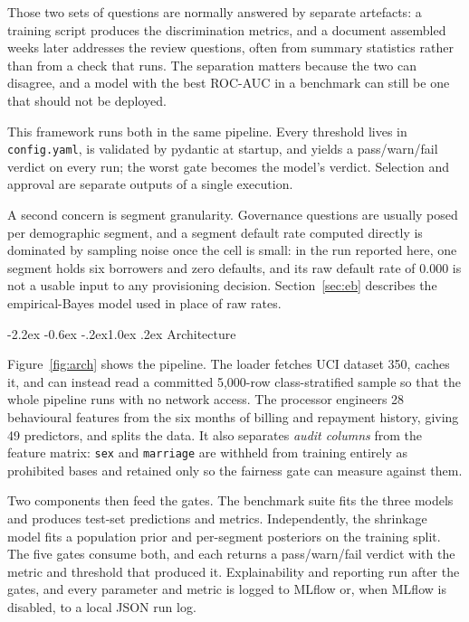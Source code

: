 \documentclass[10pt,a4paper]{article}
\makeatletter
\renewcommand\section{\@startsection{section}{1}{\z@}%
  {-2.2ex \@plus -0.6ex \@minus -.2ex}{1.0ex \@plus .2ex}%
  {\normalfont\large\bfseries}}
\newcommand{\code}[1]{\texttt{\small #1}}
\makeatother
\begin{document}
Those two sets of questions are normally answered by separate artefacts: a
training script produces the discrimination metrics, and a document assembled
weeks later addresses the review questions, often from summary statistics rather
than from a check that runs. The separation matters because the two can
disagree, and a model with the best ROC-AUC in a benchmark can still be one that
should not be deployed.

This framework runs both in the same pipeline. Every threshold lives in
\code{config.yaml}, is validated by pydantic at startup, and yields a
pass/warn/fail verdict on every run; the worst gate becomes the model's verdict.
Selection and approval are separate outputs of a single execution.

A second concern is segment granularity. Governance questions are usually posed
per demographic segment, and a segment default rate computed directly is
dominated by sampling noise once the cell is small: in the run reported here, one
segment holds six borrowers and zero defaults, and its raw default rate of
$0.000$ is not a usable input to any provisioning decision. Section~\ref{sec:eb}
describes the empirical-Bayes model used in place of raw rates.

\section{Architecture}

Figure~\ref{fig:arch} shows the pipeline. The loader fetches UCI dataset 350,
caches it, and can instead read a committed 5{,}000-row class-stratified sample
so that the whole pipeline runs with no network access. The processor engineers
28 behavioural features from the six months of billing and repayment history,
giving 49 predictors, and splits the data. It also separates \emph{audit
columns} from the feature matrix: \code{sex} and \code{marriage} are withheld
from training entirely as prohibited bases and retained only so the fairness
gate can measure against them.

Two components then feed the gates. The benchmark suite fits the three models
and produces test-set predictions and metrics. Independently, the shrinkage
model fits a population prior and per-segment posteriors on the training split.
The five gates consume both, and each returns a pass/warn/fail verdict with the
metric and threshold that produced it. Explainability and reporting run after
the gates, and every parameter and metric is logged to MLflow or, when MLflow is
disabled, to a local JSON run log.
\end{document}
